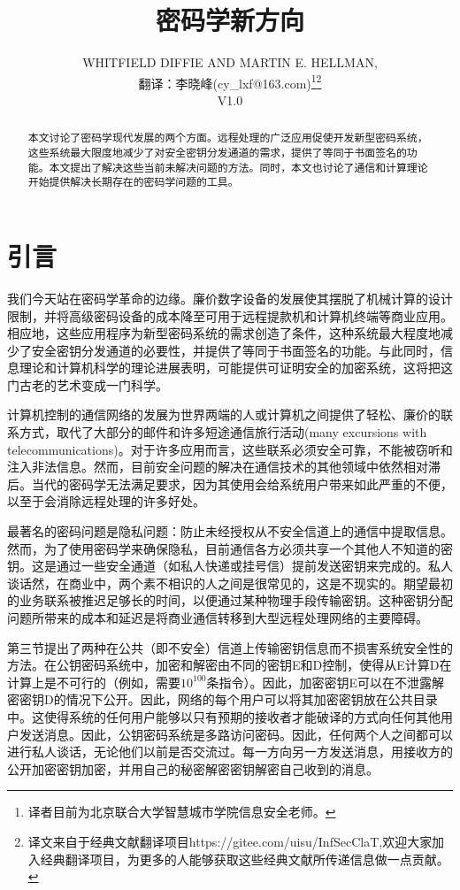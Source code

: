 \documentclass[]{article}
\title{密码学新方向}
\author{WHITFIELD DIFFIE AND MARTIN E. HELLMAN, \\
{\small  翻译：李晓峰(cy\_lxf@163.com)}\footnote{译者目前为北京联合大学智慧城市学院信息安全老师。}\footnote{译文来自于经典文献翻译项目https://gitee.com/uisu/InfSecClaT,欢迎大家加入经典翻译项目，为更多的人能够获取这些经典文献所传递信息做一点贡献。}\\
{\small  V1.0}
}
\begin{document}
	
	\maketitle
	
	\begin{abstract}
		本文讨论了密码学现代发展的两个方面。远程处理的广泛应用促使开发新型密码系统，这些系统最大限度地减少了对安全密钥分发通道的需求，提供了等同于书面签名的功能。本文提出了解决这些当前未解决问题的方法。同时，本文也讨论了通信和计算理论开始提供解决长期存在的密码学问题的工具。
	\end{abstract}

	\section{引言}
	我们今天站在密码学革命的边缘。廉价数字设备的发展使其摆脱了机械计算的设计限制，并将高级密码设备的成本降至可用于远程提款机和计算机终端等商业应用。相应地，这些应用程序为新型密码系统的需求创造了条件，这种系统最大程度地减少了安全密钥分发通道的必要性，并提供了等同于书面签名的功能。与此同时，信息理论和计算机科学的理论进展表明，可能提供可证明安全的加密系统，这将把这门古老的艺术变成一门科学。
	
	计算机控制的通信网络的发展为世界两端的人或计算机之间提供了轻松、廉价的联系方式，取代了大部分的邮件和许多短途通信旅行活动(many excursions with telecommunications)。对于许多应用而言，这些联系必须安全可靠，不能被窃听和注入非法信息。然而，目前安全问题的解决在通信技术的其他领域中依然相对滞后。当代的密码学无法满足要求，因为其使用会给系统用户带来如此严重的不便，以至于会消除远程处理的许多好处。
	
	最著名的密码问题是隐私问题：防止未经授权从不安全信道上的通信中提取信息。然而，为了使用密码学来确保隐私，目前通信各方必须共享一个其他人不知道的密钥。这是通过一些安全通道（如私人快递或挂号信）提前发送密钥来完成的。私人谈话然，在商业中，两个素不相识的人之间是很常见的，这是不现实的。期望最初的业务联系被推迟足够长的时间，以便通过某种物理手段传输密钥。这种密钥分配问题所带来的成本和延迟是将商业通信转移到大型远程处理网络的主要障碍。
	
	第三节提出了两种在公共（即不安全）信道上传输密钥信息而不损害系统安全性的方法。在公钥密码系统中，加密和解密由不同的密钥E和D控制，使得从E计算D在计算上是不可行的（例如，需要$10^{100}$条指令）。因此，加密密钥E可以在不泄露解密密钥D的情况下公开。因此，网络的每个用户可以将其加密密钥放在公共目录中。这使得系统的任何用户能够以只有预期的接收者才能破译的方式向任何其他用户发送消息。因此，公钥密码系统是多路访问密码。因此，任何两个人之间都可以进行私人谈话，无论他们以前是否交流过。每一方向另一方发送消息，用接收方的公开加密密钥加密，并用自己的秘密解密密钥解密自己收到的消息。
	
\end{document}
